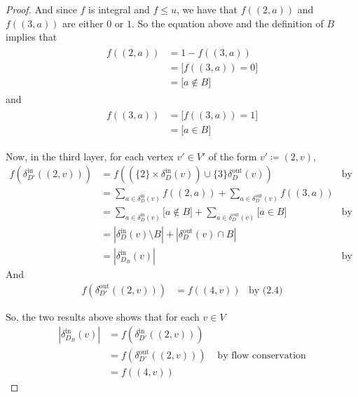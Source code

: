 \documentclass[a4paper,10pt, leqno]{article}
\theoremstyle{definition}
\begin{document}
\begin{proof}
And since $f$ is integral and $f \leq u$, we have that $f((2, a))$ and $f((3, a))$ are either $0$ or $1$. So the equation above and the definition of $B$ implies that 
\begin{align*}
\tag{2.10}
\begin{split}
 f((2, a)) &= 1 - f((3, a)) \\
 &= \lbrack f((3, a)) = 0 \rbrack \\
 &= \lbrack a \notin B \rbrack
\end{split}
\end{align*}
and
\begin{align*}
\tag{2.11}
\begin{split}
 f((3, a)) &= \lbrack f((3, a)) = 1 \rbrack \\
 &= \lbrack a \in B \rbrack
\end{split}
\end{align*}

Now, in the third layer, for each vertex $v' \in V'$ of the form $v' \coloneqq (2, v)$, 
\begin{align*}
 f(\delta_{D'}^\text{in}((2, v))) &= f((\{2\} \times \delta_{D}^\text{in}(v)) \cup \{3\} \delta_{D}^\text{out}(v))  &\text{by (2.4)}\\
 &= \sum_{a \in \delta_{D}^\text{in}(v)}{f((2, a))} + \sum_{a \in \delta_{D}^\text{out}(v)}{f((3, a))}  \\
 &= \sum_{a \in \delta_{D}^\text{in}(v)}{\lbrack a \notin B \rbrack} + \sum_{a \in \delta_{D}^\text{out}(v)}{\lbrack a \in B \rbrack}  &\text{by (2.10) and (2.11)} \\
 &= |\delta_{D}^\text{in}(v) \setminus B| + |\delta_{D}^\text{out}(v) \cap B| \\
 &= |\delta_{D_B}^\text{in}(v)| &\text{by (2.5)} 
\end{align*}
And 
\begin{align*}
 f(\delta_{D'}^\text{out}((2, v))) &= f((4, v)) &\text{by (2.4)}
\end{align*}

So, the two results above shows that for each $v \in V$
\begin{align*}
 \tag{2.12}
 |\delta_{D_B}^\text{in}(v)| &= f(\delta_{D'}^\text{in}((2, v))) \\
 &= f(\delta_{D'}^\text{out}((2, v))) &\text{ by flow conservation} \\
 &= f((4, v))
\end{align*}


\end{proof}
\end{document}
